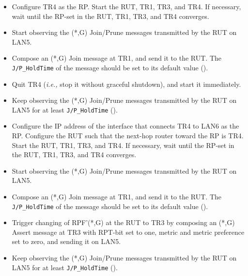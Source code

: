 \documentclass[11pt]{report}
\newcommand{\ie}{\emph{i.e.,}\xspace}
\begin{document}

\begin{itemize}

  \item Configure TR4 as the RP. Start the RUT, TR1, TR3, and TR4. If
  necessary, wait until the RP-set in the RUT, TR1, TR3, and TR4
  converges.

  \item Start observing the (*,G) Join/Prune messages transmitted by the
  RUT on LAN5.

  \item Compose an (*,G) Join message at TR1, and send it to the RUT. 
  The \verb=J/P_HoldTime= of the message should be set to its default
  value ({\PimsmJPHoldTime}).

  \item Quit TR4 (\ie stop it without graceful shutdown), and start it
  immediately.

  \item Keep observing the (*,G) Join/Prune messages transmitted by the
  RUT on LAN5 for at least \verb=J/P_HoldTime= ({\PimsmJPHoldTime}).

\end{itemize}


\begin{itemize}

  \item Configure the IP address of the interface that connects TR4 to LAN6 as
  the RP. Configure the RUT such that the next-hop router toward the RP is
  TR4. Start the RUT, TR1, TR3, and TR4. If necessary, wait until the
  RP-set in the RUT, TR1, TR3, and TR4 converges.

  \item Start observing the (*,G) Join/Prune messages transmitted by the
  RUT on LAN5.

  \item Compose an (*,G) Join message at TR1, and send it to the RUT. 
  The \verb=J/P_HoldTime= of the message should be set to its default
  value ({\PimsmJPHoldTime}).

  \item Trigger changing of RPF'(*,G) at the RUT to TR3 by composing an
  (*,G) Assert message at TR3 with RPT-bit set to one, metric and metric 
  preference set to zero, and sending it on LAN5.

  \item Keep observing the (*,G) Join/Prune messages transmitted by the
  RUT on LAN5 for at least \verb=J/P_HoldTime= ({\PimsmJPHoldTime}).

\end{itemize}
\end{document}
